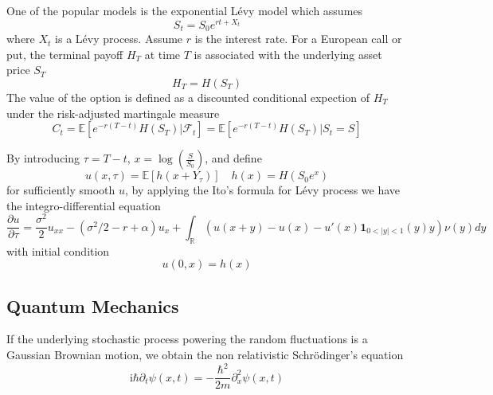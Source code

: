 \documentclass[10pt,a4paper]{article}
\newcommand{\ii}[0]{\mathrm{i}}
\newcommand{\RR}[0]{\mathbb{R}}
\theoremstyle{definition}
\begin{document}
One of the popular models is the exponential L\'evy model which assumes
\begin{equation}
	S_t = S_0 e^{rt+X_t}
\end{equation}
where $X_t$ is a L\'evy process. Assume $r$ is the interest rate. For a European call or put, the terminal payoff $H_T$ at time $T$ is associated with the underlying asset price $S_T$
\begin{equation}
	H_T = H(S_T)
\end{equation}
 The value of the option is defined as a discounted conditional expection of $H_T$ under the risk-adjusted martingale measure
\begin{equation}
	C_t = \mathbb{E}[e^{-r(T-t)}H(S_T)|\mathcal{F}_t] = \mathbb{E}[e^{-r(T-t)}H(S_T)|S_t=S]
\end{equation}

By introducing $\tau = T-t$, $x=\log\left( \frac{S}{S_0} \right)$, and define
\begin{equation}
	u(x,\tau) = \mathbb{E}[h(x+Y_\tau)]\quad h(x) = H(S_0 e^x)
\end{equation}
 for sufficiently smooth $u$, by applying the Ito's formula for L\'evy process we have the integro-differential equation
\begin{equation}
	\frac{\partial u}{\partial \tau} = \frac{\sigma^2}{2}u_{xx} - (\sigma^2/2-r+\alpha) u_x + \int_\RR (u(x+y)-u(x)-u'(x)\mathbf{1}_{0<|y|<1}(y)y)\nu(y)dy
\end{equation}
with initial condition
\begin{equation}
	u(0,x) = h(x)
\end{equation}


\subsection{Quantum Mechanics}

If the underlying stochastic process powering the random fluctuations is a Gaussian Brownian motion, we obtain the non relativistic Schr\"odinger's equation
\begin{equation}
	\ii \hbar \partial_t \psi(x,t) = -\frac{\hbar^2}{2m}\partial^2_{x} \psi(x,t)
\end{equation}
\end{document}
